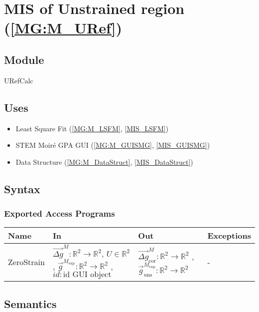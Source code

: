 \documentclass[12pt, titlepage]{article}
\begin{document}
\section{MIS of Unstrained region (\texorpdfstring{\cref{MG:M_URef}}))} \label{MIS_URef}

\subsection{Module}
URefCalc
\subsection{Uses}
\begin{itemize}
\item Least Square Fit (\cref{MG:M_LSFM}, \cref{MIS_LSFM})
\item STEM Moir{\'e} GPA GUI (\cref{MG:M_GUISMG}, \cref{MIS_GUISMG})
\item Data Structure (\cref{MG:M_DataStruct}, \cref{MIS_DataStruct})
\end{itemize}

\subsection{Syntax}

\subsubsection{Exported Access Programs}

\begin{center}
\begin{tabular}{p{2cm} p{4cm} p{4cm} p{2cm}}
\hline
\textbf{Name} & \textbf{In} & \textbf{Out} & \textbf{Exceptions} \\
\hline
ZeroStrain & $\overrightarrow{\Delta g}^M:\mathbb{R}^2\rightarrow\mathbb{R}^2$, $U \in \mathbb{R}^2$ , $\overrightarrow{g}^{M_{\text{exp}}}:\mathbb{R}^2\rightarrow\mathbb{R}^2$ , $id : \text{id GUI object}$  & $\overrightarrow{\Delta g}_{\text{cor}}^M:\mathbb{R}^2\rightarrow\mathbb{R}^2$ , $\overrightarrow{g}_{\text{uns}}^{M_{\text{exp}}}:\mathbb{R}^2\rightarrow\mathbb{R}^2$ & - \\
\hline
\end{tabular}
\end{center}

\subsection{Semantics}
\end{document}
